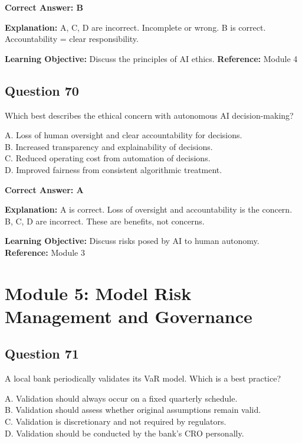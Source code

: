 \documentclass[11pt]{article}
\begin{document}
	\vspace{0.4em}
	\textbf{Correct Answer: B}
	
	\textbf{Explanation:}
	A, C, D are incorrect. Incomplete or wrong.
	B is correct. Accountability = clear responsibility.
	
	\textbf{Learning Objective:} Discuss the principles of AI ethics.
	\textbf{Reference:} Module 4
	
	\subsection*{Question 70}
	Which best describes the ethical concern with autonomous AI
	decision-making?
	
	A. Loss of human oversight and clear accountability for decisions.\\
	B. Increased transparency and explainability of decisions.\\
	C. Reduced operating cost from automation of decisions.\\
	D. Improved fairness from consistent algorithmic treatment.
	
	\vspace{0.4em}
	\textbf{Correct Answer: A}
	
	\textbf{Explanation:}
	A is correct. Loss of oversight and accountability is the concern.
	B, C, D are incorrect. These are benefits, not concerns.
	
	\textbf{Learning Objective:} Discuss risks posed by AI to human autonomy.
	\textbf{Reference:} Module 3
	
	\newpage
	\section{Module 5: Model Risk Management and Governance}
	
	\subsection*{Question 71}
	A local bank periodically validates its VaR model. Which is a best
	practice?
	
	A. Validation should always occur on a fixed quarterly schedule.\\
	B. Validation should assess whether original assumptions remain valid.\\
	C. Validation is discretionary and not required by regulators.\\
	D. Validation should be conducted by the bank's CRO personally.
	
\end{document}
